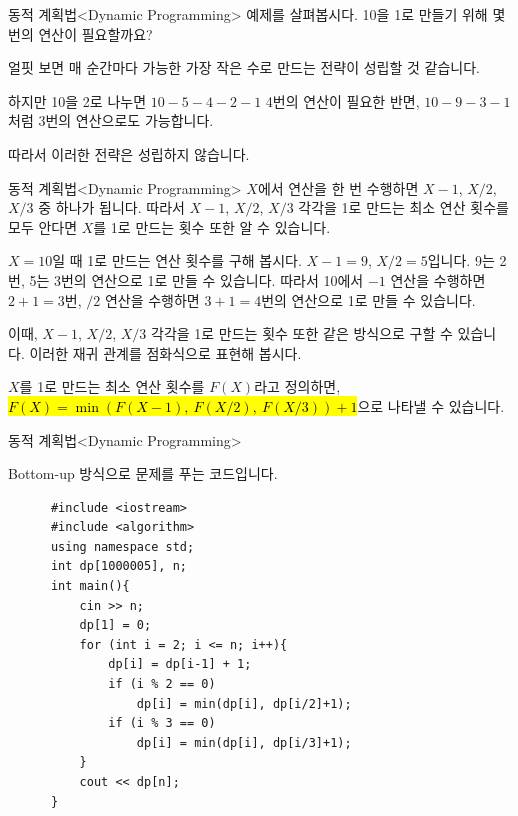 \begin{frame}{동적 계획법}{<Dynamic Programming>}
  \vspace{4mm}
  예제를 살펴봅시다. 10을 1로 만들기 위해 몇 번의 연산이 필요할까요?\par\vspace{3mm}
  얼핏 보면 매 순간마다 가능한 가장 작은 수로 만드는 전략이 성립할 것 같습니다.\par\vspace{3mm}
  하지만 10을 2로 나누면 $10 - 5 - 4 - 2 - 1$ \alert{4번}의 연산이 필요한 반면,
  $10 - 9 - 3 - 1$처럼 \alert{3번}의 연산으로도 가능합니다.\par\vspace{3mm}
  따라서 이러한 전략은 성립하지 않습니다.
\end{frame}

\begin{frame}{동적 계획법}{<Dynamic Programming>}
  \vspace{2mm}
  $X$에서 연산을 한 번 수행하면 $X{-}1$, $X/2$, $X/3$ 중 하나가 됩니다.
  따라서 $X{-}1$, $X/2$, $X/3$ 각각을 1로 만드는 최소 연산 횟수를 모두 안다면
  $X$를 1로 만드는 횟수 또한 알 수 있습니다.\par\vspace{2mm}
  $X = 10$일 때 1로 만드는 연산 횟수를 구해 봅시다. $X{-}1 = 9$, $X/2 = 5$입니다.
  9는 2번, 5는 3번의 연산으로 1로 만들 수 있습니다. 따라서 10에서 $-1$ 연산을 수행하면
  $2 + 1 = 3$번, $/2$ 연산을 수행하면 $3 + 1 = 4$번의 연산으로 1로 만들 수 있습니다.\par\vspace{2mm}
  이때, $X{-}1$, $X/2$, $X/3$ 각각을 1로 만드는 횟수 또한 같은 방식으로 구할 수 있습니다.
  이러한 재귀 관계를 점화식으로 표현해 봅시다.\par\vspace{2mm}
  $X$를 1로 만드는 최소 연산 횟수를 $F(X)$라고 정의하면,
  \hl{$F(X) = \min(F(X{-}1),\ F(X/2),\ F(X/3)) + 1$}으로 나타낼 수 있습니다.
\end{frame}

\begin{frame}[fragile]{동적 계획법}{<Dynamic Programming>}
  \begin{twocol}
    \vspace{20mm}
    \alert{Bottom-up 방식}으로 문제를 푸는 코드입니다.
  \colsplit
    \begin{verbatim}
      #include <iostream>
      #include <algorithm>
      using namespace std;
      int dp[1000005], n;
      int main(){
          cin >> n;
          dp[1] = 0;
          for (int i = 2; i <= n; i++){
              dp[i] = dp[i-1] + 1;
              if (i % 2 == 0)
                  dp[i] = min(dp[i], dp[i/2]+1);
              if (i % 3 == 0)
                  dp[i] = min(dp[i], dp[i/3]+1);
          }
          cout << dp[n];
      }
    \end{verbatim}
  \end{twocol}
\end{frame}

